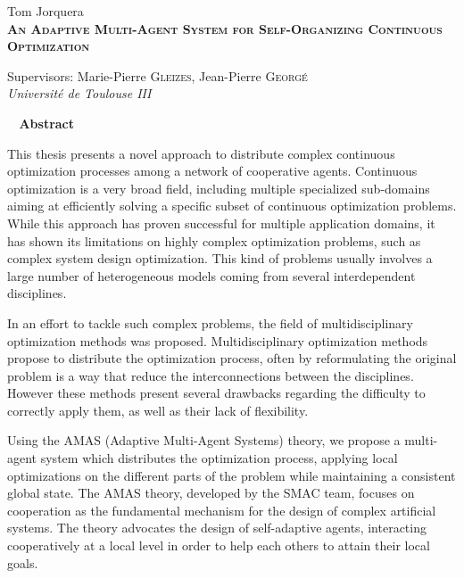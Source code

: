\if@doubleinterligne\renewcommand{}\fi
  \thispagestyle{plain}
  \begin{center}
    \Large Tom Jorquera\\
    \addvspace{2mm}
    \textsc{\textbf{An Adaptive Multi-Agent System for Self-Organizing Continuous Optimization}}\\
	\addvspace{2mm}
    \begin{center}
   	 \large\normalfont Supervisors: Marie-Pierre \textsc{Gleizes}, Jean-Pierre \textsc{Georgé}\\
   	  \large\normalfont \emph{Université de Toulouse III}\\
     \end{center}
    \addvspace{3mm}
    \textbf{\hrulefill~ Abstract ~\hrulefill}\\  
    
  \end{center}
  \vspace{-0.3cm}
        
\normalsize \hspace{0.6cm}This thesis presents a novel approach to distribute complex continuous optimization processes among a network of cooperative agents. Continuous optimization is a very broad field, including multiple specialized sub-domains aiming at efficiently solving a specific subset of continuous optimization problems. While this approach has proven successful for multiple application domains, it has shown its limitations on highly complex optimization problems, such as complex system design optimization. This kind of problems usually involves a large number of heterogeneous models coming from several interdependent disciplines.

In an effort to tackle such complex problems, the field of multidisciplinary optimization methods was proposed. Multidisciplinary optimization methods propose to distribute the optimization process, often by reformulating the original problem is a way that reduce the interconnections between the disciplines. However these methods present several drawbacks regarding the difficulty to correctly apply them, as well as their lack of flexibility.

Using the AMAS (Adaptive Multi-Agent Systems) theory, we propose a multi-agent system which distributes the optimization process, applying local optimizations on the different parts of the problem while maintaining a consistent global state. The AMAS theory, developed by the SMAC team, focuses on cooperation as the fundamental mechanism for the design of complex artificial systems. The theory advocates the design of self-adaptive agents, interacting cooperatively at a local level in order to help each others to attain their local goals.

